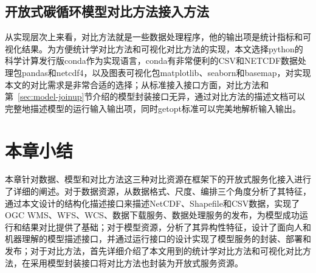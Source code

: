 \subsection{开放式碳循环模型对比方法接入方法}

从实现层次上来看，对比方法就是一些数据处理程序，他的输出项是统计指标和可视化结果。为方便统计学对比方法和可视化对比方法的实现，本文选择python的科学计算发行版conda作为实现语言，conda有非常便利的CSV和NETCDF数据处理包pandas和netcdf4，以及图表可视化包matplotlib、seaborn和basemap，对实现本文的对比需求是非常合适的选择；从标准接入接口方面，对比方法和第~\ref{sec:model-joinup}节介绍的模型封装接口无异，通过对比方法的描述文档可以完整地描述模型的运行输入输出项，同时getopt标准可以完美地解析输入输出。


\section{本章小结}
本章针对数据、模型和对比方法这三种对比资源在框架下的开放式服务化接入进行了详细的阐述。对于数据资源，从数据格式、尺度、编排三个角度分析了其特征，通过本文设计的结构化描述接口来描述NetCDF、Shapefile和CSV数据，实现了OGC WMS、WFS、WCS、数据下载服务、数据处理服务的发布，为模型成功运行和结果对比提供了基础；对于模型资源，分析了其异构性特征，设计了面向人和机器理解的模型描述接口，并通过运行接口的设计实现了模型服务的封装、部署和发布；对于对比方法，首先详细介绍了本文用到的统计学对比方法和可视化对比方法，在采用模型封装接口将对比方法也封装为开放式服务资源。